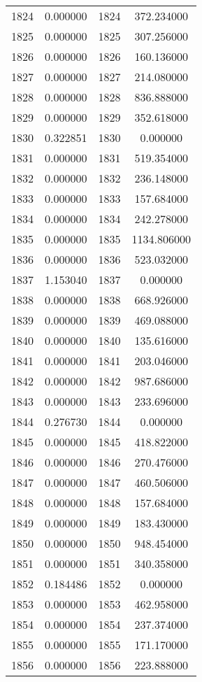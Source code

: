 \documentclass[12pt]{article}
\begin{document}
\begin{longtable}{@{}cccc@{}}
1824 & 0.000000 & 1824 & 372.234000 \\
1825 & 0.000000 & 1825 & 307.256000 \\
1826 & 0.000000 & 1826 & 160.136000 \\
1827 & 0.000000 & 1827 & 214.080000 \\
1828 & 0.000000 & 1828 & 836.888000 \\
1829 & 0.000000 & 1829 & 352.618000 \\
1830 & 0.322851 & 1830 & 0.000000 \\
1831 & 0.000000 & 1831 & 519.354000 \\
1832 & 0.000000 & 1832 & 236.148000 \\
1833 & 0.000000 & 1833 & 157.684000 \\
1834 & 0.000000 & 1834 & 242.278000 \\
1835 & 0.000000 & 1835 & 1134.806000 \\
1836 & 0.000000 & 1836 & 523.032000 \\
1837 & 1.153040 & 1837 & 0.000000 \\
1838 & 0.000000 & 1838 & 668.926000 \\
1839 & 0.000000 & 1839 & 469.088000 \\
1840 & 0.000000 & 1840 & 135.616000 \\
1841 & 0.000000 & 1841 & 203.046000 \\
1842 & 0.000000 & 1842 & 987.686000 \\
1843 & 0.000000 & 1843 & 233.696000 \\
1844 & 0.276730 & 1844 & 0.000000 \\
1845 & 0.000000 & 1845 & 418.822000 \\
1846 & 0.000000 & 1846 & 270.476000 \\
1847 & 0.000000 & 1847 & 460.506000 \\
1848 & 0.000000 & 1848 & 157.684000 \\
1849 & 0.000000 & 1849 & 183.430000 \\
1850 & 0.000000 & 1850 & 948.454000 \\
1851 & 0.000000 & 1851 & 340.358000 \\
1852 & 0.184486 & 1852 & 0.000000 \\
1853 & 0.000000 & 1853 & 462.958000 \\
1854 & 0.000000 & 1854 & 237.374000 \\
1855 & 0.000000 & 1855 & 171.170000 \\
1856 & 0.000000 & 1856 & 223.888000 \\

\end{longtable}
\end{document}
